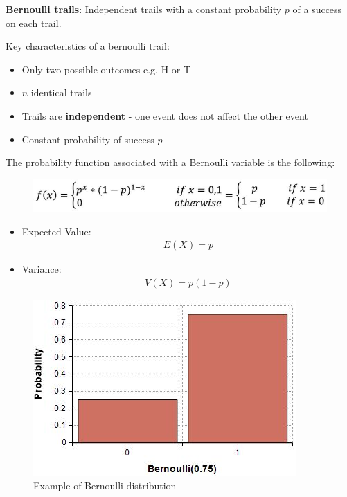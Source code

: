 \documentclass[10pt,a4paper]{article}
\begin{document}
\begin{tcolorbox}[breakable,colback=white]
    \textbf{Bernoulli trails}: Independent trails with a constant probability $p$ of a success on each trail.
\end{tcolorbox}

Key characteristics of a bernoulli trail:
\begin{itemize}
    \item Only two possible outcomes e.g. H or T
    \item $n$ identical trails
    \item Trails are \textbf{independent} - one event does not affect the other event
    \item Constant probability of success $p$ 
\end{itemize}

The probability function associated with a Bernoulli variable is the following:
\begin{figure} [h!]
    \centering
    \includegraphics[scale=0.6]{Bernoulli.JPG}
\end{figure}
\begin{itemize}
    \item Expected Value:
    \begin{align*}
        E(X) = p
    \end{align*}
    \item Variance:
    \begin{align*}
        V(X) = p(1-p)
    \end{align*} 
\end{itemize}

\begin{figure} [h!]
    \centering
    \includegraphics[scale=0.7]{Bernoulli distribution.JPG}
    \caption{Example of Bernoulli distribution}
\end{figure}
\end{document}
